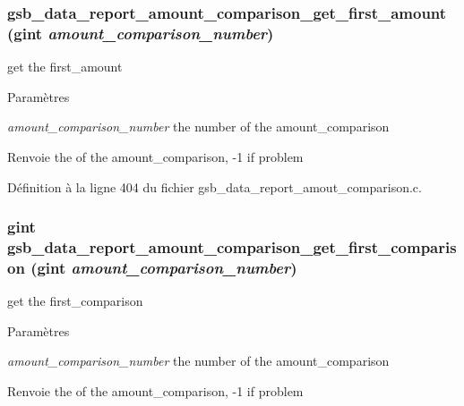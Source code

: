 \subsubsection[{gsb\_\-data\_\-report\_\-amount\_\-comparison\_\-get\_\-first\_\-amount}]{ gsb\_\-data\_\-report\_\-amount\_\-comparison\_\-get\_\-first\_\-amount (gint {\em amount\_\-comparison\_\-number})}\label{gsb__data__report__amout__comparison_8h_acf6a83475c566080242c5c6163abde54}
get the first\_\-amount


\begin{DoxyParams}{Paramètres}
\item[{\em amount\_\-comparison\_\-number}]the number of the amount\_\-comparison\end{DoxyParams}
\begin{DoxyReturn}{Renvoie}
the of the amount\_\-comparison, -\/1 if problem 
\end{DoxyReturn}


Définition à la ligne 404 du fichier gsb\_\-data\_\-report\_\-amout\_\-comparison.c.

\subsubsection[{gsb\_\-data\_\-report\_\-amount\_\-comparison\_\-get\_\-first\_\-comparison}]{\setlength{\rightskip}{0pt plus 5cm}gint gsb\_\-data\_\-report\_\-amount\_\-comparison\_\-get\_\-first\_\-comparison (gint {\em amount\_\-comparison\_\-number})}\label{gsb__data__report__amout__comparison_8h_a44f7f91f11a27716875d00423b81deea}
get the first\_\-comparison


\begin{DoxyParams}{Paramètres}
\item[{\em amount\_\-comparison\_\-number}]the number of the amount\_\-comparison\end{DoxyParams}
\begin{DoxyReturn}{Renvoie}
the of the amount\_\-comparison, -\/1 if problem 
\end{DoxyReturn}


